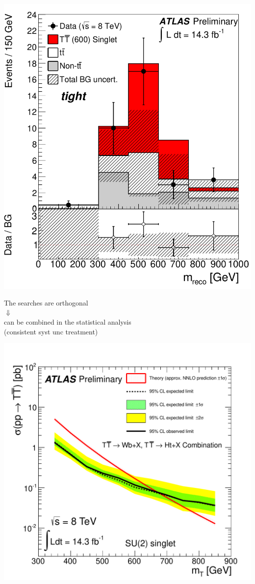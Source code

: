 \begin{frame}
\begin{minipage}{.5\textwidth}
\includegraphics[width=.5\textwidth]{pics/combo/VLQAna_WbX_1W_MWb_4_ELEMUON_cutflow1234567_NOMINAL}

\end{minipage}\begin{minipage}{.5\textwidth}\centering
\myskip

The searches are orthogonal\\
$\Downarrow$\\
can be combined in the statistical analysis\\
(consistent {\cccolor syst unc} treatment)

\includegraphics[width=.9\textwidth]{pics/combo/lim_singlet_comb.pdf}

\end{minipage}

\end{frame}



